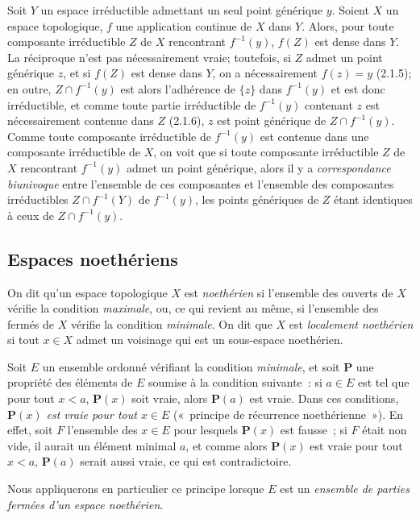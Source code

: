 \begin{env}[2.1.8]
\label{0.2.1.8-fr}
Soit $Y$ un espace irréductible admettant un seul point générique $y$. Soient
$X$ un espace topologique, $f$ une application continue de $X$ dans $Y$.
Alors, pour toute composante irréductible $Z$ de $X$ rencontrant $f^{-1}(y)$,
$f(Z)$ est dense dans $Y$. La réciproque n'est pas nécessairement vraie;
toutefois, si $Z$ admet un point générique $z$, et si $f(Z)$ est dense dans
$Y$, on a nécessairement $f(z)=y$ (2.1.5); en outre, $Z\cap f^{-1}(y)$ est
alors l'adhérence de $\{z\}$ dans $f^{-1}(y)$ et est donc irréductible, et
comme toute partie irréductible de $f^{-1}(y)$ contenant $z$ est
nécessairement contenue dans $Z$ (2.1.6), $z$ est point générique de
$Z\cap f^{-1}(y)$. Comme toute composante irréductible de $f^{-1}(y)$ est
contenue dans une composante irréductible de $X$, on voit que si toute
composante irréductible $Z$ de $X$ rencontrant $f^{-1}(y)$ admet un point
générique, alors il y a \emph{correspondance biunivoque} entre l'ensemble de
ces composantes et l'ensemble des composantes irréductibles
$Z\cap f^{-1}(Y)$ de $f^{-1}(y)$, les points génériques de $Z$ étant
identiques à ceux de $Z\cap f^{-1}(y)$.
\end{env}


\subsection{Espaces noethériens}
\label{subsection:0.2.2-fr}

\begin{env}[2.2.1]
\label{0.2.2.1-fr}
On dit qu'un espace topologique $X$ est \emph{noethérien} si l'ensemble des
ouverts de $X$ vérifie la condition \emph{maximale}, ou, ce qui revient au
même, si l'ensemble des fermés de $X$ vérifie la condition \emph{minimale}. On
dit que $X$ est \emph{localement noethérien} si tout $x\in X$ admet un
voisinage qui est un sous-espace noethérien.
\end{env}

\begin{env}[2.2.2]
\label{0.2.2.2-fr}
Soit $E$ un ensemble ordonné vérifiant la condition \emph{minimale}, et soit
$\boldsymbol{P}$ une propriété des éléments de $E$ soumise à la condition suivante~: si
$a\in E$ est tel que pour tout $x<a$, $\boldsymbol{P}(x)$ soit vraie, alors $\boldsymbol{P}(a)$ est
vraie. Dans ces conditions, \emph{$\boldsymbol{P}(x)$ est vraie pour tout $x\in E$}
(«~principe de récurrence noethérienne~»). En effet, soit $F$ l'ensemble des
$x\in E$ pour lesquels $\boldsymbol{P}(x)$ est fausse~; si $F$ était non vide, il aurait un
élément minimal $a$, et comme alors $\boldsymbol{P}(x)$ est vraie pour tout $x<a$, $\boldsymbol{P}(a)$
serait aussi vraie, ce qui est contradictoire.

Nous appliquerons en particulier ce principe lorsque $E$ est un \emph{ensemble
de parties fermées d'un espace noethérien}.
\end{env}

